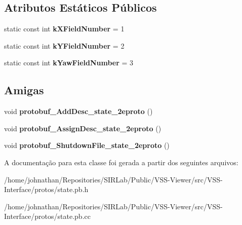 \subsection*{Atributos Estáticos Públicos}
\begin{DoxyCompactItemize}
\item 
static const int {\bfseries k\+X\+Field\+Number} = 1\hypertarget{classvss__state_1_1Pose_a55da0ea3762949322b44da8206bb84f0}{}\label{classvss__state_1_1Pose_a55da0ea3762949322b44da8206bb84f0}

\item 
static const int {\bfseries k\+Y\+Field\+Number} = 2\hypertarget{classvss__state_1_1Pose_a0a2f401726b1453c65cbaa99fde61b4e}{}\label{classvss__state_1_1Pose_a0a2f401726b1453c65cbaa99fde61b4e}

\item 
static const int {\bfseries k\+Yaw\+Field\+Number} = 3\hypertarget{classvss__state_1_1Pose_a4f1b9b7cb0a470421a29a733329a7e7c}{}\label{classvss__state_1_1Pose_a4f1b9b7cb0a470421a29a733329a7e7c}

\end{DoxyCompactItemize}
\subsection*{Amigas}
\begin{DoxyCompactItemize}
\item 
void {\bfseries protobuf\+\_\+\+Add\+Desc\+\_\+state\+\_\+2eproto} ()\hypertarget{classvss__state_1_1Pose_aab1a2c258f8122a403a979ff57e2a706}{}\label{classvss__state_1_1Pose_aab1a2c258f8122a403a979ff57e2a706}

\item 
void {\bfseries protobuf\+\_\+\+Assign\+Desc\+\_\+state\+\_\+2eproto} ()\hypertarget{classvss__state_1_1Pose_a57d9367bc8a7a94ead11d11194cca1b6}{}\label{classvss__state_1_1Pose_a57d9367bc8a7a94ead11d11194cca1b6}

\item 
void {\bfseries protobuf\+\_\+\+Shutdown\+File\+\_\+state\+\_\+2eproto} ()\hypertarget{classvss__state_1_1Pose_a4e6dc5e8e72799859c4e9556d090e57d}{}\label{classvss__state_1_1Pose_a4e6dc5e8e72799859c4e9556d090e57d}

\end{DoxyCompactItemize}


A documentação para esta classe foi gerada a partir dos seguintes arquivos\+:\begin{DoxyCompactItemize}
\item 
/home/johnathan/\+Repositories/\+S\+I\+R\+Lab/\+Public/\+V\+S\+S-\/\+Viewer/src/\+V\+S\+S-\/\+Interface/protos/state.\+pb.\+h\item 
/home/johnathan/\+Repositories/\+S\+I\+R\+Lab/\+Public/\+V\+S\+S-\/\+Viewer/src/\+V\+S\+S-\/\+Interface/protos/state.\+pb.\+cc\end{DoxyCompactItemize}
